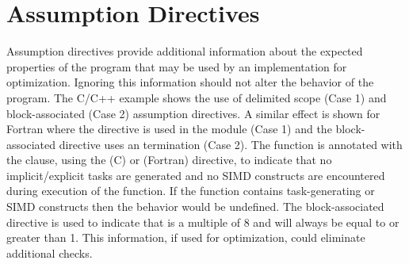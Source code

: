 \section{Assumption Directives}
\label{sec:assumption}



Assumption directives provide additional information about the expected properties of 
the program that may be used by an implementation for optimization. 
Ignoring this information should not alter the behavior of the program. The C/C++ example 
shows the use of delimited scope (Case 1) and block-associated (Case 2) assumption directives.
A similar effect is shown for Fortran where the  directive is used in the module (Case 1)
and the block-associated directive uses an  termination (Case 2). 
The function  is annotated with the  clause, using the  
(C) or  (Fortran) directive, to indicate that no implicit/explicit tasks are generated and no 
SIMD constructs are encountered during execution of the function. If the function  contains 
task-generating or SIMD constructs then the behavior would be undefined. The block-associated 
 directive is used to indicate that  is a multiple of 8 and 
will always be equal to or greater than 1. This information, if used for optimization,
could eliminate additional checks.

